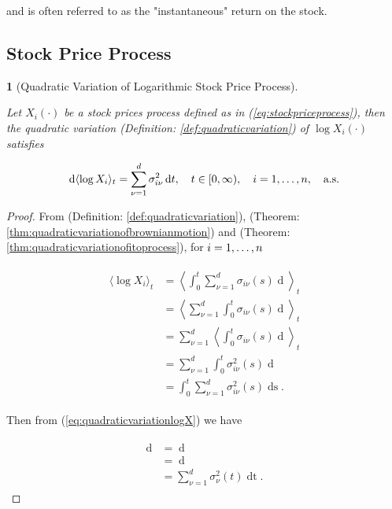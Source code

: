 \documentclass[british]{amsart}
\numberwithin{equation}{section}
\numberwithin{figure}{section}
\theoremstyle{plain}
\theoremstyle{definition}
\theoremstyle{plain}
\theoremstyle{plain}
\theoremstyle{plain}
\newtheorem{prop}[thm]{\protect\propositionname}
\theoremstyle{remark}
\theoremstyle{plain}
\providecommand{\propositionname}{Proposition}
\renewcommand{\d}[1]{\mathop{\mathrm{d}{#1}}}
\newcommand{\ranget}{t\in[0,\infty)}
\newcommand{\almostsurely}{\text{a.s.}}
\begin{document}
and is often referred to as the "instantaneous" return on the stock.

\subsection{Stock Price Process}

\begin{prop} [Quadratic Variation of Logarithmic Stock Price Process]
	\label{prop:crossvarlogX}

	Let $X_{i}(\cdot)$ be a stock prices process defined as in (\ref{eq:stockpriceprocess}), 
	then the quadratic variation (Definition: \ref{def:quadraticvariation}) of
	$\log{X_{i}(\cdot)}$ satisfies

	\begin{equation}
		\d{\langle \log{X_{i}} \rangle_{t}} = \sum_{\nu=1}^{d} \sigma_{i\nu}^2\d{t},
		\quad \ranget,
		\quad \rangei,
		\quad \almostsurely
	\end{equation}

\end{prop}

\begin{proof} 

	From (Definition: \ref{def:quadraticvariation}), (Theorem: 
	\ref{thm:quadraticvariationofbrownianmotion}) and (Theorem: 
	\ref{thm:quadraticvariationofitoprocess}), for $i=1,\dots,n$

	\begin{gather}
		\begin{split} 
			\label{eq:quadraticvariationlogX}
			\langle \log{X_{i}} \rangle_{t} 
			 & = \left< \int_{0}^{t} \sum_{\nu=1}^{d} \sigma_{i\nu}(s) \d{W_{\nu}(s)} \right>_{t} \\
			 & = \left< \sum_{\nu=1}^{d} \int_{0}^{t} \sigma_{i\nu}(s) \d{W_{\nu}(s)} \right>_{t} \\
			 & = \sum_{\nu=1}^{d} \left< \int_{0}^{t} \sigma_{i\nu}(s) \d{W_{\nu}(s)} \right>_{t} \\
			 & = \sum_{\nu=1}^{d} \int_{0}^{t} \sigma_{i\nu}^{2}(s) \d{\langle W_{\nu}(s) \rangle } \\
			 & = \int_{0}^{t} \sum_{\nu=1}^{d} \sigma_{i\nu}^{2}(s) \d{s}.
		\end{split}
	\end{gather}
	
	Then from (\ref{eq:quadraticvariationlogX}) we have
	
	\begin{gather}
		\begin{split}
			\d{\langle \log{X} \rangle_{t}}
				& = \d{\left<\int_{0}^{t} \sum_{\nu=1}^{d} \sigma_{\nu}(s) \d{W_{\nu}(s)}\right>_{t}}\\
				& = \d{\left(\int_{0}^{t} \sum_{\nu=1}^{d} \sigma_{\nu}^{2}(s) \d{s}\right)} \\
				& = \sum_{\nu=1}^{d} \sigma_{\nu}^{2}(t) \d{t}.
		\end{split}
	\end{gather}

\end{proof}
\end{document}
